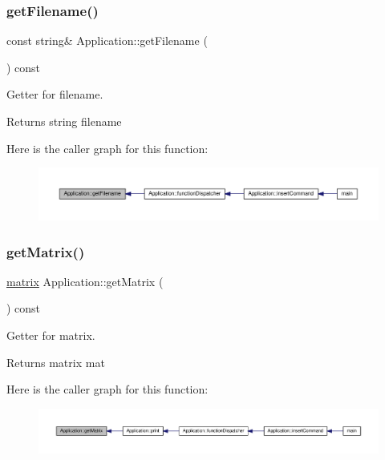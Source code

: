 \subsubsection{\texorpdfstring{get\+Filename()}{getFilename()}}
{\footnotesize\ttfamily const string\& Application\+::get\+Filename (\begin{DoxyParamCaption}{ }\end{DoxyParamCaption}) const\hspace{0.3cm}{\ttfamily [inline]}}

Getter for filename. \begin{DoxyReturn}{Returns}
string filename 
\end{DoxyReturn}
Here is the caller graph for this function\+:
\nopagebreak
\begin{figure}[H]
\begin{center}
\leavevmode
\includegraphics[width=350pt]{class_application_a778575fb76de5352152d8928e1c3410f_icgraph}
\end{center}
\end{figure}
\mbox{\label{class_application_a67aeb617ca44a18045612d92f1d8afa0}} 
\subsubsection{\texorpdfstring{get\+Matrix()}{getMatrix()}}
{\footnotesize\ttfamily \hyperlink{formula_8h_a869e2a5deeb3daa4c82d6bc91cf20d92}{matrix} Application\+::get\+Matrix (\begin{DoxyParamCaption}{ }\end{DoxyParamCaption}) const\hspace{0.3cm}{\ttfamily [inline]}}

Getter for matrix. \begin{DoxyReturn}{Returns}
matrix mat 
\end{DoxyReturn}
Here is the caller graph for this function\+:
\nopagebreak
\begin{figure}[H]
\begin{center}
\leavevmode
\includegraphics[width=350pt]{class_application_a67aeb617ca44a18045612d92f1d8afa0_icgraph}
\end{center}
\end{figure}
\mbox{\label{class_application_a2c6518d7f121299d9be8c66d31997fbc}} 
